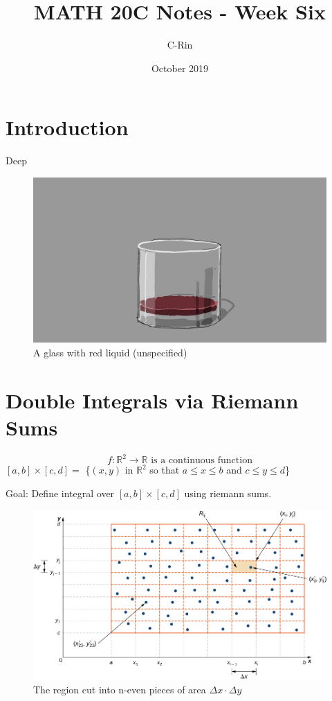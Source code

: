 \documentclass[12pt, oneside]{article}
\title{MATH 20C Notes - Week Six}
\author{C-Rin}
\date{October 2019}
\begin{document}
\maketitle

\section*{Introduction}
Deep 

\begin{figure}[h!]
\centering
\includegraphics[scale=0.1]{glass.jpg}
\caption{A glass with red liquid (unspecified)}
\end{figure}

\newpage
\section{Double Integrals via Riemann Sums}
\[f:\mathbb{R}^2\rightarrow\mathbb{R}\mbox{ is a continuous function}\]
$[a,b]\times[c,d] = $ \{$(x,y)$ in $\mathbb{R}^2$ so that $a\leq x\leq b$ and $c\leq y \leq d$\}

Goal: Define integral over $[a,b]\times [c,d]$ using riemann sums.
\begin{figure}[h!]
    \centering
    \includegraphics[scale =.5]{nEven.jpg}
    \caption{The region cut into n-even pieces of area $\Delta x\cdot \Delta y$}
    \label{}
\end{figure}
\end{document}
